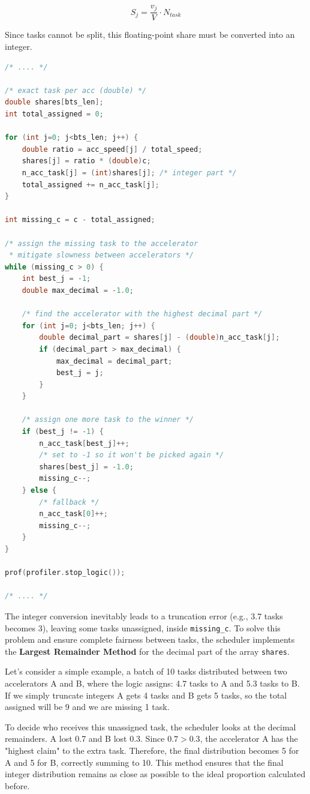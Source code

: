 $$
    S_j = \frac{v_j}{V} \cdot N_{task}
$$

Since tasks cannot be split, this floating-point share must be converted into an integer.

\begin{lstlisting}[caption={Static Partitioning: Distribution Logic}, language=C++] 
/* .... */

/* exact task per acc (double) */
double shares[bts_len];
int total_assigned = 0;

for (int j=0; j<bts_len; j++) {
    double ratio = acc_speed[j] / total_speed;
    shares[j] = ratio * (double)c;
    n_acc_task[j] = (int)shares[j]; /* integer part */
    total_assigned += n_acc_task[j];
}

int missing_c = c - total_assigned;

/* assign the missing task to the accelerator 
 * mitigate slowness between accelerators */
while (missing_c > 0) {
    int best_j = -1;
    double max_decimal = -1.0;

    /* find the accelerator with the highest decimal part */
    for (int j=0; j<bts_len; j++) {
        double decimal_part = shares[j] - (double)n_acc_task[j];
        if (decimal_part > max_decimal) {
            max_decimal = decimal_part;
            best_j = j;
        }
    }

    /* assign one more task to the winner */
    if (best_j != -1) {
        n_acc_task[best_j]++;
        /* set to -1 so it won't be picked again */
        shares[best_j] = -1.0; 
        missing_c--;
    } else {
        /* fallback */
        n_acc_task[0]++;
        missing_c--;
    }
}

prof(profiler.stop_logic());

/* .... */
\end{lstlisting}

The integer conversion inevitably leads to a truncation error (e.g., 3.7 tasks becomes 3), leaving some tasks unassigned, inside \texttt{missing\_c}. To solve this problem and ensure complete fairness between tasks, the scheduler implements the \textbf{Largest Remainder Method} for the decimal part of the array \texttt{shares}. 

Let's consider a simple example, a batch of 10 tasks distributed between two accelerators A and B, where the logic assigns: 4.7 tasks to A and 5.3 tasks to B. If we simply truncate integers A gets 4 tasks and B gets 5 tasks, so the total assigned will be 9 and we are missing 1 task.

To decide who receives this unassigned task, the scheduler looks at the decimal remainders. A lost 0.7 and B lost 0.3. Since $0.7>0.3$, the accelerator A has the "highest claim" to the extra task. Therefore, the final distribution becomes 5 for A and 5 for B, correctly summing to 10. This method ensures that the final integer distribution remains as close as possible to the ideal proportion calculated before.

